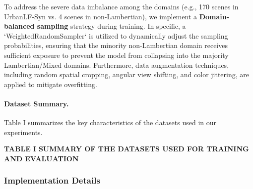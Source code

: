To address the severe data imbalance among the domains (e.g., 170 scenes in UrbanLF-Syn vs. 4 scenes in non-Lambertian), we implement a \textbf{Domain-balanced sampling} strategy during training. In specific, a `WeightedRandomSampler` is utilized to dynamically adjust the sampling probabilities, ensuring that the minority non-Lambertian domain receives sufficient exposure to prevent the model from collapsing into the majority Lambertian/Mixed domains. Furthermore, data augmentation techniques, including random spatial cropping, angular view shifting, and color jittering, are applied to mitigate overfitting.

\paragraph{Dataset Summary.}

Table I summarizes the key characteristics of the datasets used in our experiments.

\textbf{TABLE I}
\textbf{SUMMARY OF THE DATASETS USED FOR TRAINING AND EVALUATION}

\begin{table}[!t]
\small
\caption{Dataset Domain / Scene Type Scenes (Train/Test).}
\label{tab:table1}
\centering
{}
\end{table}
\subsubsection{Implementation Details}

